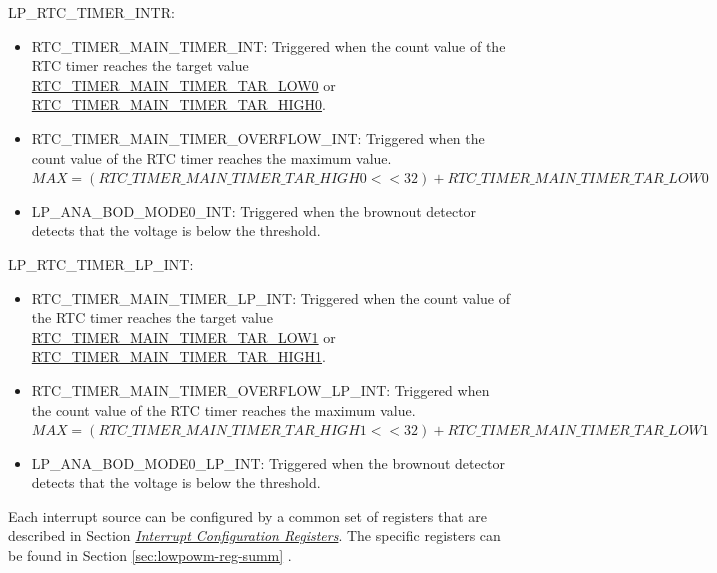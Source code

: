 \documentclass[main\_\_EN.tex]{subfiles}
\begin{document}
LP\_RTC\_TIMER\_INTR:
\begin{itemize}
\item \label{int:RTCTIMERMAINTIMERINT}RTC\_TIMER\_MAIN\_TIMER\_INT: Triggered when the count value of the RTC timer reaches the target value \hyperref[fielddesc:RTCTIMERMAINTIMERTARLOW0]{RTC\_TIMER\_MAIN\_TIMER\_TAR\_LOW0} or \hyperref[fielddesc:RTCTIMERMAINTIMERTARHIGH0]{RTC\_TIMER\_MAIN\_TIMER\_TAR\_HIGH0}.
\item \label{int:RTCTIMERMAINTIMEROVERFLOWINT}RTC\_TIMER\_MAIN\_TIMER\_OVERFLOW\_INT: Triggered when the count value of the RTC timer reaches the maximum value.\\
$MAX = (\hyperref[fielddesc:RTCTIMERMAINTIMERTARHIGH0]{RTC\_TIMER\_MAIN\_TIMER\_TAR\_HIGH0} << 32) + \hyperref[fielddesc:RTCTIMERMAINTIMERTARLOW0]{RTC\_TIMER\_MAIN\_TIMER\_TAR\_LOW0}$

\item \label{int:LPANABODMODE0INT}LP\_ANA\_BOD\_MODE0\_INT: Triggered when the brownout detector detects that the voltage is below the threshold.
\end{itemize}

LP\_RTC\_TIMER\_LP\_INT:
\begin{itemize}
\item \label{int:RTCTIMERMAINTIMERLPINT}RTC\_TIMER\_MAIN\_TIMER\_LP\_INT: Triggered when the count value of the RTC timer reaches the target value \hyperref[fielddesc:RTCTIMERMAINTIMERTARLOW1]{RTC\_TIMER\_MAIN\_TIMER\_TAR\_LOW1} or \hyperref[fielddesc:RTCTIMERMAINTIMERTARHIGH1]{RTC\_TIMER\_MAIN\_TIMER\_TAR\_HIGH1}.
\item \label{int:RTCTIMERMAINTIMEROVERFLOWLPINT}RTC\_TIMER\_MAIN\_TIMER\_OVERFLOW\_LP\_INT: Triggered when the count value of the RTC timer reaches the maximum value.\\
$MAX = (\hyperref[fielddesc:RTCTIMERMAINTIMERTARHIGH1]{RTC\_TIMER\_MAIN\_TIMER\_TAR\_HIGH1} << 32) + \hyperref[fielddesc:RTCTIMERMAINTIMERTARLOW1]{RTC\_TIMER\_MAIN\_TIMER\_TAR\_LOW1}$

\item \label{int:LPANABODMODE0LPINT}LP\_ANA\_BOD\_MODE0\_LP\_INT: Triggered when the brownout detector detects that the voltage is below the threshold.
\end{itemize}

Each interrupt source can be configured by a common set of registers that are described in Section \hyperref[interrupt-config-registers]{\textit{Interrupt Configuration Registers}}. The specific registers can be found in Section \ref{sec:lowpowm-reg-summ} \textit{}.
\end{document}
